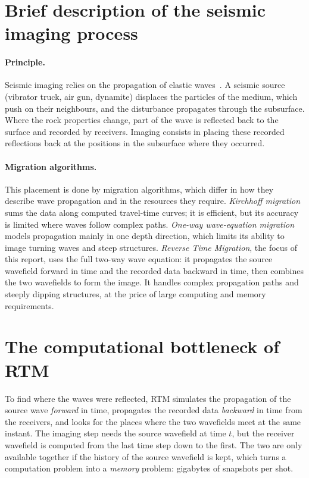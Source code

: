 \documentclass[letterpaper,11pt,leqno]{article}
\begin{document}
\section{Brief description of the seismic imaging process}\label{s:seismic imaging}

\paragraph{Principle.} Seismic imaging relies on the propagation of elastic waves~\citep{Robein2003}. A seismic source (vibrator truck, air gun, dynamite) displaces the particles of the medium, which push on their neighbours, and the disturbance propagates through the subsurface. Where the rock properties change, part of the wave is reflected back to the surface and recorded by receivers. Imaging consists in placing these recorded reflections back at the positions in the subsurface where they occurred.

\paragraph{Migration algorithms.} This placement is done by migration algorithms, which differ in how they describe wave propagation and in the resources they require. \emph{Kirchhoff migration} sums the data along computed travel-time curves; it is efficient, but its accuracy is limited where waves follow complex paths. \emph{One-way wave-equation migration} models propagation mainly in one depth direction, which limits its ability to image turning waves and steep structures. \emph{Reverse Time Migration}, the focus of this report, uses the full two-way wave equation: it propagates the source wavefield forward in time and the recorded data backward in time, then combines the two wavefields to form the image. It handles complex propagation paths and steeply dipping structures, at the price of large computing and memory requirements.

\section{The computational bottleneck of RTM}\label{s:computation bottleneck}

To find where the waves were reflected, RTM simulates the propagation of the source wave \emph{forward} in time, propagates the recorded data \emph{backward} in time from the receivers, and looks for the places where the two wavefields meet at the same instant. The imaging step needs the source wavefield at time $t$, but the receiver wavefield is computed from the last time step down to the first. The two are only available together if the history of the source wavefield is kept, which turns a computation problem into a \emph{memory} problem: gigabytes of snapshots per shot.
\end{document}
